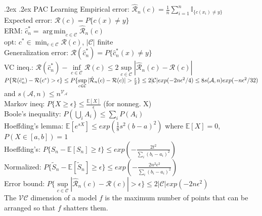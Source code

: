 \documentclass[11pt,landscape,a4paper,fleqn]{article}
\makeatletter
\renewcommand{\section}{\@startsection{section}{1}{0mm}%
                                {.2ex}%
                                {.2ex}%
	                                {\color{myred}\sffamily\small\bfseries}}
\DeclareMathOperator*{\argmin}{arg\,min}
\makeatother
\begin{document}
\begin{multicols*}{4}
\section{PAC Learning}
Empirical error: $\hat{\mathcal{R}}_n(c) = \tfrac{1}{n}\sum_{i=1}^n \mathbb{I}_{\{c(x_i)\neq y\}}$ \\
Expected error: $\mathcal{R}(c) = P\{c(x)\neq y\}$ \\
ERM: $\hat{c}_n^* = \argmin_{c\in\mathcal{C}} \hat{\mathcal{R}}_n(c)$ \\
opt: $c^* \in \min_{c\in\mathcal{C}} \mathcal{R}(c)$, $|\mathcal{C}|$ finite \\
Generalization error: $\mathcal{R}(\hat{c}_n^*) = P\{ \hat{c}_n^*(x)\neq y \}$ \\
VC ineq.: $\mathcal{R}(\hat{c}_n^*) - \inf\limits_{c\in\mathcal{C}}\mathcal{R}(c) \leq 2\sup\limits_{c\in\mathcal{C}}|\hat{\mathcal{R}}_n(c) - \mathcal{R}(c)|$ \\ 
$P\{ \mathcal{R}(\hat{c}_n^*) - \mathcal{R}(c^*) > \epsilon \} \leq P\{ \sup\limits_{c\in\mathcal{C}}|\hat{\mathcal{R}}_n(c) - \mathcal{R}(c)| > \frac{\epsilon}{2} \} \\
\leq 2|\mathcal{C}| exp(-2n\epsilon ^2 /4) \leq 8s(\mathcal{A},n)exp(-n\epsilon ^{2} /32)$ and $s(\mathcal{A},n) \leq n^{\mathcal{V_{\mathcal{A}}}}$ \\
Markov ineq: $P\{X\geq\epsilon\} \leq \tfrac{\mathbb{E}[X]}{\epsilon}$ (for nonneg. X) \\
Boole's inequality: $P(\bigcup_i A_i) \leq \sum_i P(A_i)$ \\
Hoeffding's lemma: $\mathbb{E}[e^{sX}] \leq exp(\tfrac{1}{8}s^2(b-a)^2)$ where $\mathbb{E}[X]=0$, $P(X\in[a,b])=1$ \\
Hoeffding's: $P\{S_n {-} \mathbb{E}[S_n] {\geq} t\} {\leq} exp({-} \frac{2t^2}{\sum_i (b_i - a_i)^2})$ \\
Normalized: $P\{\widetilde{S}_n {-} \mathbb{E}[\widetilde{S}_n] {\geq} \epsilon\} {\leq} exp({-} \frac{2n^2 \epsilon ^2}{\sum_i (b_i {-} a_i)^2})$ \\
{\small Error bound: $P\{ \sup\limits_{c\in\mathcal{C}}|\hat{\mathcal{R}}_n(c) - \mathcal{R}(c)| > \epsilon \} \leq 2|\mathcal{C}| exp(-2n\epsilon ^2)$} \\
The $\mathcal{VC}$ dimension of a model $f$ is the maximum number of points that can be arranged so that $f$ shatters them.

\end{multicols*}
\end{document}
